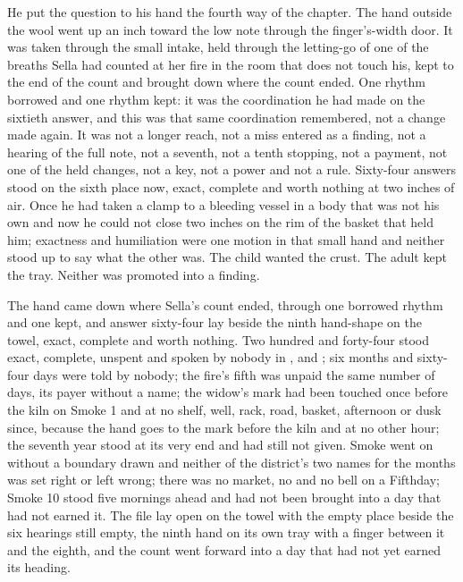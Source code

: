 He put the question to his hand the fourth way of the chapter. The hand outside the wool went up an inch toward the low note through the finger's-width door. It was taken through the small intake, held through the letting-go of one of the breaths Sella had counted at her fire in the room that does not touch his, kept to the end of the count and brought down where the count ended. One rhythm borrowed and one rhythm kept: it was the coordination he had made on the sixtieth answer, and this was that same coordination remembered, not a change made again. It was not a longer reach, not a miss entered as a finding, not a hearing of the full note, not a seventh, not a tenth stopping, not a payment, not one of the held changes, not a key, not a power and not a rule. Sixty-four answers stood on the sixth place now, exact, complete and worth nothing at two inches of air. Once he had taken a clamp to a bleeding vessel in a body that was not his own and now he could not close two inches on the rim of the basket that held him; exactness and humiliation were one motion in that small hand and neither stood up to say what the other was. The child wanted the crust. The adult kept the tray. Neither was promoted into a finding.

The hand came down where Sella's count ended, through one borrowed rhythm and one kept, and answer sixty-four lay beside the ninth hand-shape on the towel, exact, complete and worth nothing. Two hundred and forty-four stood exact, complete, unspent and spoken by nobody in ,  and ; six months and sixty-four days were told by nobody; the fire's fifth was unpaid the same number of days, its payer without a name; the widow's mark had been touched once before the kiln on Smoke 1 and at no shelf, well, rack, road, basket, afternoon or dusk since, because the hand goes to the mark before the kiln and at no other hour; the seventh year stood at its very end and had still not given. Smoke went on without a boundary drawn and neither of the district's two names for the months was set right or left wrong; there was no market, no  and no bell on a Fifthday; Smoke 10 stood five mornings ahead and had not been brought into a day that had not earned it. The file lay open on the towel with the empty place beside the six hearings still empty, the ninth hand on its own tray with a finger between it and the eighth, and the count went forward into a day that had not yet earned its heading.
